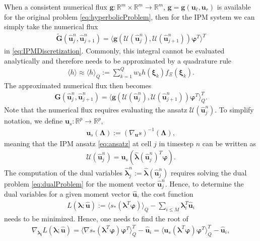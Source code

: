 When a consistent numerical flux $\bm g:\mathbb{R}^m\times\mathbb{R}^m\to\mathbb{R}^m$, $\bm g = \bm g(\bm u_\ell, \bm u_r)$ is available for the original problem \eqref{eq:hyperbolicProblem}, then for the IPM system we can simply take the numerical flux
\begin{align*}
 \bm{\tilde G}(\bm{\hat u}_{j}^n,\bm{\hat u}_{j+1}^{n}) = \langle \bm g(\mathcal{U}(\bm{\hat u}_j^n),\mathcal{U}(\bm{\hat u}_{j+1}^n))\bm{\varphi}^T\rangle^T
\end{align*}
in \eqref{eq:IPMDiscretization}. Commonly, this integral cannot be evaluated analytically and therefore needs to be approximated by a quadrature rule
\begin{align*}
\langle h \rangle \approx \langle h \rangle_{Q} := \sum_{k=1}^Q w_k h(\bm{\xi}_k)f_{\Xi}(\bm{\xi}_k).
\end{align*}
The approximated numerical flux then becomes
\begin{align}\label{eq:numericalFluxIPM}
 \bm{G}(\bm{\hat u}_{j}^n,\bm{\hat u}_{j+1}^{n}) = \langle \bm g(\mathcal{U}(\bm{\hat u}_j^n),\mathcal{U}(\bm{\hat u}_{j+1}^n))\bm{\varphi}^T\rangle^T_Q.
\end{align}
Note that the numerical flux requires evaluating the ansatz $\mathcal{U}(\bm{\hat u}_j^n)$. To simplify notation, we define $\bm{u}_{s}:\mathbb{R}^p \to \mathbb{R}^p$,
\begin{align*}
\bm{u}_{s}(\bm\Lambda):=\left( \nabla_{\bm{u}} s \right)^{-1}(\bm\Lambda),
\end{align*}
meaning that the IPM ansatz \eqref{eq:ansatz} at cell $j$ in timestep $n$ can be written as
\begin{align*}
\mathcal{U}(\bm{\hat u}_j^n) = \bm{u}_{s}(\bm{\hat{\lambda}}(\bm{\hat u}_j^n)^T \bm{\varphi}).
\end{align*}
The computation of the dual variables $\bm{\hat\lambda}_j^n:=\bm{\hat\lambda}(\bm{\hat u}_j^n)$ requires solving the dual problem \eqref{eq:dualProblem} for the moment vector $\bm{\hat u}_{j}^{n}$. Hence, to determine the dual variables for a given moment vector $\bm{\hat{u}}$, the cost function
\begin{align}\label{eq:L}
L(\bm{\lambda};\bm{\hat{u}}) := \langle s_*(\bm{\lambda}^T \bm\varphi)\rangle_Q - \sum_{i\leq M}\bm{\lambda}_i^T \bm{\hat u}_i
\end{align}
needs to be minimized. Hence, one needs to find the root of
\begin{align*}
\nabla_{\bm{\lambda_i}}L(\bm{\lambda};\bm{\hat{u}}) = \langle \nabla s_*(\bm{\lambda}^T \bm\varphi)\bm\varphi^T\rangle_Q^T - \bm{\hat u}_i = \langle \bm u_s(\bm{\lambda}^T \bm\varphi)\bm\varphi^T\rangle_Q^T - \bm{\hat u}_i,
\end{align*}
